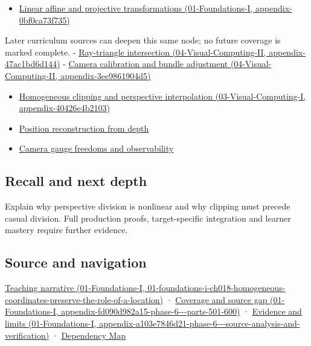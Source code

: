\begin{itemize}
\tightlist
\item
  \href{../01-Foundations-I/main.pdf\#nameddest=appendix-0bf0ca73f735}{Linear affine and projective transformations (01-Foundations-I, appendix-0bf0ca73f735)}
\end{itemize}

Later curriculum sources can deepen this same node; no future coverage is marked complete. - \href{../04-Visual-Computing-II/main.pdf\#nameddest=appendix-47ac1bd6d144}{Ray-triangle intersection (04-Visual-Computing-II, appendix-47ac1bd6d144)} - \href{../04-Visual-Computing-II/main.pdf\#nameddest=appendix-3ee9861904d5}{Camera calibration and bundle adjustment (04-Visual-Computing-II, appendix-3ee9861904d5)}

\begin{itemize}
\tightlist
\item
  \href{../03-Visual-Computing-I/main.pdf\#nameddest=appendix-40426e4b2103}{Homogeneous clipping and perspective interpolation (03-Visual-Computing-I, appendix-40426e4b2103)}
\item
  \hyperref[appendix-2cbf2968e866]{Position reconstruction from depth}
\item
  \hyperref[appendix-113f0267e5f4]{Camera gauge freedoms and observability}
\end{itemize}

\subsection{Recall and next depth}\label{appendix-cb3b26862282-recall-and-next-depth}

Explain why perspective division is nonlinear and why clipping must precede casual division. Full production proofs, target-specific integration and learner mastery require further evidence.

\subsection{Source and navigation}\label{appendix-cb3b26862282-source-and-navigation}

\href{../01-Foundations-I/main.pdf\#nameddest=01-foundations-i-ch018-homogeneous-coordinates-preserve-the-role-of-a-location}{Teaching narrative (01-Foundations-I, 01-foundations-i-ch018-homogeneous-coordinates-preserve-the-role-of-a-location)} · \href{../01-Foundations-I/main.pdf\#nameddest=appendix-fd090d982a15-phase-6---parts-501-600}{Coverage and source gap (01-Foundations-I, appendix-fd090d982a15-phase-6-\/-\/-parts-501-600)} · \href{../01-Foundations-I/main.pdf\#nameddest=appendix-a103e7846d21-phase-6---source-analysis-and-verification}{Evidence and limits (01-Foundations-I, appendix-a103e7846d21-phase-6-\/-\/-source-analysis-and-verification)} · \hyperref[appendix-4ad47bdd269a]{Dependency Map}

